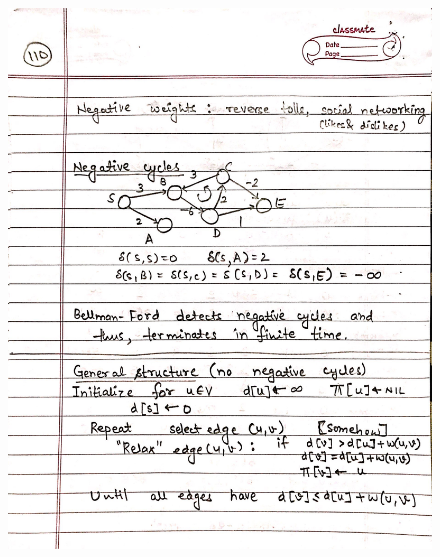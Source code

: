 \begin{figure}[H]
    \centering
    \includegraphics[scale=0.25]{"./MIT-6.006/MIT-6006-110"}
\end{figure}
\newpage
